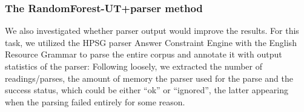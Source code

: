 \documentclass[a4paper,10pt]{scrartcl}
\theoremstyle{style}
\begin{document}













\subsubsection{The RandomForest-UT+parser method}
We also investigated whether parser output would improve the results. For this task, we utilized the HPSG parser Answer Constraint Engine \citep{ace} with the English Resource Grammar \citep{copestake2002implementing} to parse the entire corpus and annotate it with output statistics of the parser: Following \cite{wagner2007comparative} loosely, we extracted the number of readings/parses, the amount of memory the parser used for the parse and the success status, which could be either ``ok'' or ``ignored'', the latter appearing when the parsing failed entirely for some reason.
\end{document}
